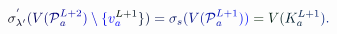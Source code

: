 \documentclass[12pt]{article}
\begin{document}
\makeatletter
\renewcommand*{\@textcolor}[3]{%
  \protect\leavevmode
  \begingroup
    \color#1{#2}#3%
  \endgroup
}
\makeatother
\begin{displaymath}
\mathcolor[RGB]{0,0,15}{\sigma} _ { \mathcolor[RGB]{0,0,30}{\lambda} ^ { \mathcolor[RGB]{0,0,45}{\prime} } } ^ { \mathcolor[RGB]{0,0,60}{'} } \mathcolor[RGB]{0,0,75}{(} \mathcolor[RGB]{0,0,90}{V} \mathcolor[RGB]{0,0,105}{(} \mathcal { \mathcolor[RGB]{0,0,120}{P} } _ { \mathcolor[RGB]{0,0,135}{a} } ^ { \mathcolor[RGB]{0,0,150}{L} \mathcolor[RGB]{0,0,165}{+} \mathcolor[RGB]{0,0,180}{2} } \mathcolor[RGB]{0,0,195}{)} \mathcolor[RGB]{0,0,210}{\setminus} \mathcolor[RGB]{0,0,225}{\{} \mathcolor[RGB]{0,0,240}{v} _ { \mathcolor[RGB]{0,0,255}{a} } ^ { \mathcolor[RGB]{0,15,0}{L} \mathcolor[RGB]{0,15,15}{+} \mathcolor[RGB]{0,15,30}{1} } \mathcolor[RGB]{0,15,45}{\}} \mathcolor[RGB]{0,15,60}{)} \mathcolor[RGB]{0,15,75}{=} \mathcolor[RGB]{0,15,90}{\sigma} _ { \mathcolor[RGB]{0,15,105}{s} } \mathcolor[RGB]{0,15,120}{(} \mathcolor[RGB]{0,15,135}{V} \mathcolor[RGB]{0,15,150}{(} \mathcal { \mathcolor[RGB]{0,15,165}{P} } _ { \mathcolor[RGB]{0,15,180}{a} } ^ { \mathcolor[RGB]{0,15,195}{L} \mathcolor[RGB]{0,15,210}{+} \mathcolor[RGB]{0,15,225}{1} } \mathcolor[RGB]{0,15,240}{)} \mathcolor[RGB]{0,15,255}{)} \mathcolor[RGB]{0,30,0}{=} \mathcolor[RGB]{0,30,15}{V} \mathcolor[RGB]{0,30,30}{(} \mathcolor[RGB]{0,30,45}{K} _ { \mathcolor[RGB]{0,30,60}{a} } ^ { \mathcolor[RGB]{0,30,75}{L} \mathcolor[RGB]{0,30,90}{+} \mathcolor[RGB]{0,30,105}{1} } \mathcolor[RGB]{0,30,120}{)} \mathcolor[RGB]{0,30,135}{.}
\end{displaymath}
\end{document}

